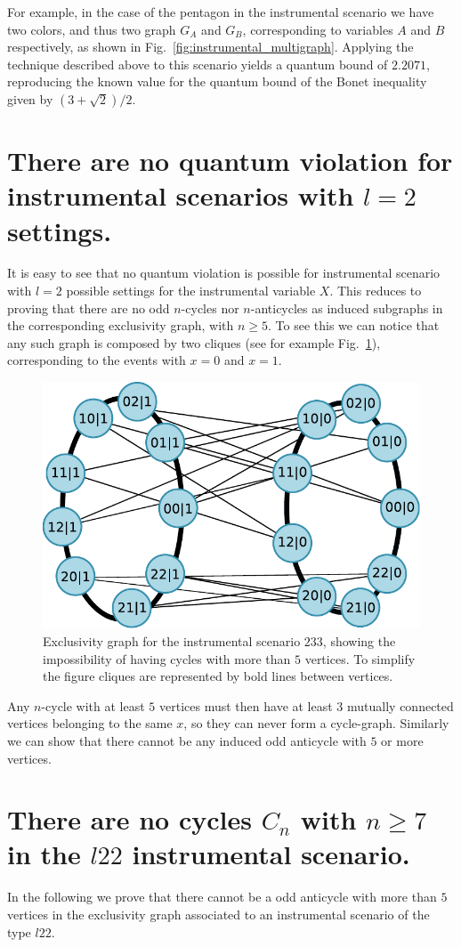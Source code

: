 \documentclass[letterpaper]{article}
\begin{document}
For example, in the case of the pentagon in the instrumental scenario we have two colors, and thus two graph $G_A$ and $G_B$, corresponding to variables $A$ and $B$ respectively, as shown in Fig.~\ref{fig:instrumental_multigraph}.
Applying the technique described above to this scenario yields a quantum
bound of $2.2071$, reproducing the known value for the quantum bound of the Bonet inequality given by $(3+\sqrt{2})/2$.

\section*{There are no quantum violation for instrumental scenarios with $l=2$
settings.}
It is easy to see that no quantum violation is possible for instrumental scenario
with $l=2$ possible settings for the instrumental variable $X$.
This reduces to proving that there are no odd $n$-cycles nor $n$-anticycles as induced
subgraphs in the corresponding exclusivity graph, with $n\ge5$.
To see this we can notice that any such graph is composed by two cliques (see
for example Fig.~\ref{fig:2mn_nocycle_proof}), corresponding to the events with $x=0$ and
$x=1$.
\begin{figure}[t]
    \centering
    \includegraphics[width=.7\columnwidth]{images/nocycles_proof.pdf}
    \caption{Exclusivity graph for the instrumental scenario $233$, showing the
        impossibility of having cycles with more than $5$ vertices. To simplify the figure cliques are
    represented by bold lines between vertices.}
    \label{fig:2mn_nocycle_proof}
\end{figure}
Any $n$-cycle with at least $5$ vertices must then have at least $3$ mutually
connected vertices belonging to the same $x$, so they can never form a
cycle-graph.
Similarly we can show that there cannot be any induced odd anticycle with $5$ or more
vertices.

\section*{There are no cycles $C_n$ with $n \ge 7$ in the $l22$ instrumental scenario.}
In the following we prove that there cannot be a odd anticycle with more than
$5$ vertices in the exclusivity graph associated to an instrumental scenario of
the type $l22$.
\end{document}
